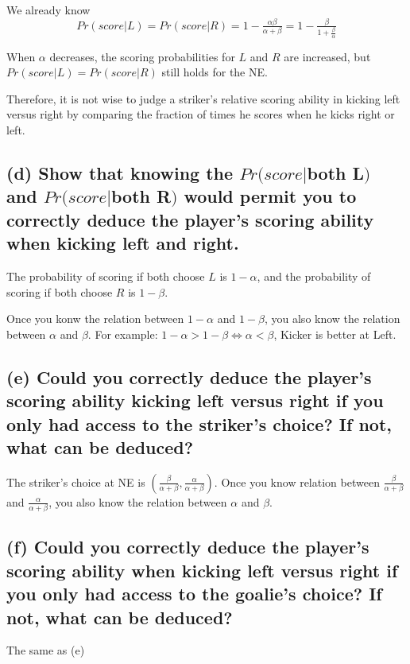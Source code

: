 \documentclass{article}
\begin{document}
We already know $$Pr(score|L) = Pr(score|R)= 1- \tfrac{\alpha \beta }{\alpha + \beta} =  1- \tfrac{\beta }{1 + \frac{\beta}{\alpha}}$$

When $\alpha$ decreases, the scoring probabilities for $L$ and $R$ are increased, but $Pr(score|L) = Pr(score|R)$ still holds for the NE.

\medskip

Therefore, it is not wise to judge a striker's relative scoring ability in kicking left versus right by comparing the fraction of times he scores when he kicks right or left.


\subsection*{(d) Show that knowing the $Pr(score|$both L$)$ and $Pr(score|$both R$)$ would permit you to correctly deduce the player's scoring ability when kicking left and right.}

The probability of scoring if both choose $L$ is $1 - \alpha$, and the probability of scoring if both choose $R$ is $1 - \beta$. 


Once you konw the relation between $1 - \alpha$ and $1 - \beta$, you also know the relation between $\alpha$ and $\beta $. For example: $1 - \alpha > 1 - \beta \iff \alpha <  \beta $, Kicker is better at Left.


\subsection*{(e) Could you correctly deduce the player's scoring ability kicking left versus right if you only had access to the striker's choice? If not, what can be deduced?}

The striker's choice at NE is $(\tfrac{\beta}{\alpha + \beta},\tfrac{\alpha}{\alpha + \beta})$.
Once you know relation between $\tfrac{\beta}{\alpha + \beta}$ and $\tfrac{\alpha}{\alpha + \beta}$, you also know the relation between $\alpha$ and $\beta $.


\subsection*{(f) Could you correctly deduce the player's scoring ability when kicking left versus right if you only had access to the goalie's choice? If not, what can be deduced?}

The same as (e)


\newpage
\end{document}
